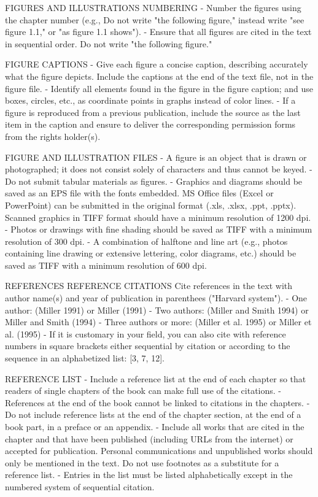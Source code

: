 FIGURES AND ILLUSTRATIONS
NUMBERING
- Number the figures using the chapter number (e.g., Do not write "the following figure," instead write "see figure 1.1," or "as figure 1.1 shows").
- Ensure that all figures are cited in the text in sequential order. Do not write "the following figure."

FIGURE CAPTIONS
- Give each figure a concise caption, describing accurately what the figure depicts. Include the captions at the end of the text file, not in the figure file.
- Identify all elements found in the figure in the figure caption; and use boxes, circles, etc., as coordinate points in graphs instead of color lines.
- If a figure is reproduced from a previous publication, include the source as the last item in the caption and ensure to deliver the corresponding permission forms from the rights holder(s).

FIGURE AND ILLUSTRATION FILES
- A figure is an object that is drawn or photographed; it does not consist solely of characters and thus cannot be keyed.
- Do not submit tabular materials as figures.
- Graphics and diagrams should be saved as an EPS file with the fonts embedded. MS Office files (Excel or PowerPoint) can be submitted in the original format (.xls, .xlsx, .ppt, .pptx). Scanned graphics in TIFF format should have a minimum resolution of 1200 dpi.
- Photos or drawings with fine shading should be saved as TIFF with a minimum resolution of 300 dpi.
- A combination of halftone and line art (e.g., photos containing line drawing or extensive lettering, color diagrams, etc.) should be saved as TIFF with a minimum resolution of 600 dpi.

REFERENCES
REFERENCE CITATIONS
Cite references in the text with author name(s) and year of publication in parenthees ("Harvard system").
- One author: (Miller 1991) or Miller (1991)
- Two authors: (Miller and Smith 1994) or Miller and Smith (1994)
- Three authors or more: (Miller et al. 1995) or Miller et al. (1995)
- If it is customary in your field, you can also cite with reference numbers in square brackets either sequential by citation or according to the sequence in an alphabetized list: [3, 7, 12].

REFERENCE LIST
- Include a reference list at the end of each chapter so that readers of single chapters of the book can make full use of the citations.
- References at the end of the book cannot be linked to citations in the chapters.
- Do not include reference lists at the end of the chapter section, at the end of a book part, in a preface or an appendix.
- Include all works that are cited in the chapter and that have been published (including URLs from the internet) or accepted for publication. Personal communications and unpublished works should only be mentioned in the text. Do not use footnotes as a substitute for a reference list.
- Entries in the list must be listed alphabetically except in the numbered system of sequential citation.

